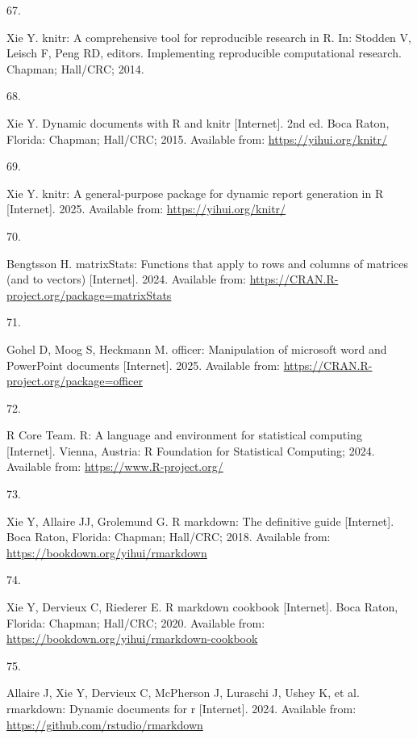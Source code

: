 \documentclass[
]{article}
\newlength{\cslhangindent}
\newlength{\csllabelwidth}
\newenvironment{CSLReferences}[2] %
 {\begin{list}{}{%
  \setlength{\itemindent}{0pt}
  \setlength{\leftmargin}{0pt}
  \setlength{\parsep}{0pt}
  \ifodd #1
   \setlength{\leftmargin}{\cslhangindent}
   \setlength{\itemindent}{-1\cslhangindent}
  \fi
  \setlength{\itemsep}{#2\baselineskip}}}
 {\end{list}}
\newcommand{\CSLLeftMargin}[1]{\parbox[t]{\csllabelwidth}{\strut#1\strut}}
\newcommand{\CSLRightInline}[1]{\parbox[t]{\linewidth - \csllabelwidth}{\strut#1\strut}}
\begin{document}
\begin{CSLReferences}{0}{1}
\CSLLeftMargin{67. }%
\CSLRightInline{Xie Y. {knitr}: A comprehensive tool for reproducible research in {R}. In: Stodden V, Leisch F, Peng RD, editors. Implementing reproducible computational research. Chapman; Hall/CRC; 2014. }

\CSLLeftMargin{68. }%
\CSLRightInline{Xie Y. Dynamic documents with {R} and knitr {[}Internet{]}. 2nd ed. Boca Raton, Florida: Chapman; Hall/CRC; 2015. Available from: \url{https://yihui.org/knitr/}}

\CSLLeftMargin{69. }%
\CSLRightInline{Xie Y. {knitr}: A general-purpose package for dynamic report generation in {R} {[}Internet{]}. 2025. Available from: \url{https://yihui.org/knitr/}}

\CSLLeftMargin{70. }%
\CSLRightInline{Bengtsson H. {matrixStats}: Functions that apply to rows and columns of matrices (and to vectors) {[}Internet{]}. 2024. Available from: \url{https://CRAN.R-project.org/package=matrixStats}}

\CSLLeftMargin{71. }%
\CSLRightInline{Gohel D, Moog S, Heckmann M. {officer}: Manipulation of microsoft word and PowerPoint documents {[}Internet{]}. 2025. Available from: \url{https://CRAN.R-project.org/package=officer}}

\CSLLeftMargin{72. }%
\CSLRightInline{R Core Team. {R}: A language and environment for statistical computing {[}Internet{]}. Vienna, Austria: R Foundation for Statistical Computing; 2024. Available from: \url{https://www.R-project.org/}}

\CSLLeftMargin{73. }%
\CSLRightInline{Xie Y, Allaire JJ, Grolemund G. R markdown: The definitive guide {[}Internet{]}. Boca Raton, Florida: Chapman; Hall/CRC; 2018. Available from: \url{https://bookdown.org/yihui/rmarkdown}}

\CSLLeftMargin{74. }%
\CSLRightInline{Xie Y, Dervieux C, Riederer E. R markdown cookbook {[}Internet{]}. Boca Raton, Florida: Chapman; Hall/CRC; 2020. Available from: \url{https://bookdown.org/yihui/rmarkdown-cookbook}}

\CSLLeftMargin{75. }%
\CSLRightInline{Allaire J, Xie Y, Dervieux C, McPherson J, Luraschi J, Ushey K, et al. {rmarkdown}: Dynamic documents for r {[}Internet{]}. 2024. Available from: \url{https://github.com/rstudio/rmarkdown}}


\end{CSLReferences}
\end{document}
